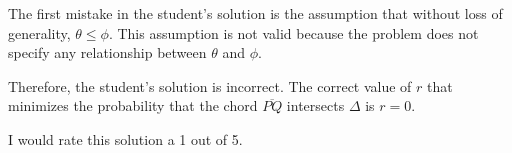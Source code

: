 The first mistake in the student's solution is the assumption that without loss of generality, $\theta \leq \phi$. This assumption is not valid because the problem does not specify any relationship between $\theta$ and $\phi$. 

Therefore, the student's solution is incorrect. The correct value of $r$ that minimizes the probability that the chord $\overline{PQ}$ intersects $\Delta$ is $r = 0$. 

I would rate this solution a 1 out of 5.
